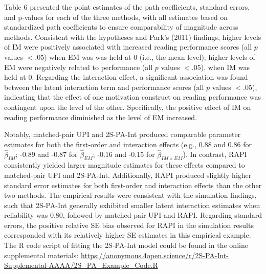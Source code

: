 \documentclass[
  man,mask]{apa6}
\begin{document}
Table 6 presented the point estimates of the path coefficients, standard errors, and p-values for each of the three methods, with all estimates based on standardized path coefficients to ensure comparability of magnitude across methods. Consistent with the hypotheses and Park's (2011) findings, higher levels of IM were positively associated with increased reading performance scores (all \(\textit{p}\) values \(< .05\)) when EM was was held at 0 (i.e., the mean level); higher levels of EM were negatively related to performance (all \(\textit{p}\) values \(< .05\)), when IM was held at 0. Regarding the interaction effect, a significant association was found between the latent interaction term and performance scores (all \(\textit{p}\) values \(< .05\)), indicating that the effect of one motivation construct on reading performance was contingent upon the level of the other. Specifically, the positive effect of IM on reading performance diminished as the level of EM increased.

Notably, matched-pair UPI and 2S-PA-Int produced comparable parameter estimates for both the first-order and interaction effects (e.g., 0.88 and 0.86 for \(\hat{\beta}_{IM}\); -0.89 and -0.87 for \(\hat{\beta}_{EM}\); -0.16 and -0.15 for \(\hat{\beta}_{IM \times EM}\)). In contrast, RAPI consistently yielded larger magnitude estimates for these effects compared to matched-pair UPI and 2S-PA-Int. Additionally, RAPI produced slightly higher standard error estimates for both first-order and interaction effects than the other two methods. The empirical results were consistent with the simulation findings, such that 2S-PA-Int generally exhibited smaller latent interaction estimates when reliability was 0.80, followed by matched-pair UPI and RAPI. Regarding standard errors, the positive relative SE bias observed for RAPI in the simulation results corresponded with its relatively higher SE estimates in this empirical example. The R code script of fitting the 2S-PA-Int model could be found in the online supplemental materials: \url{https://anonymous.4open.science/r/2S-PA-Int-Supplemental-AAAA/2S_PA_Example_Code.R}
\end{document}

